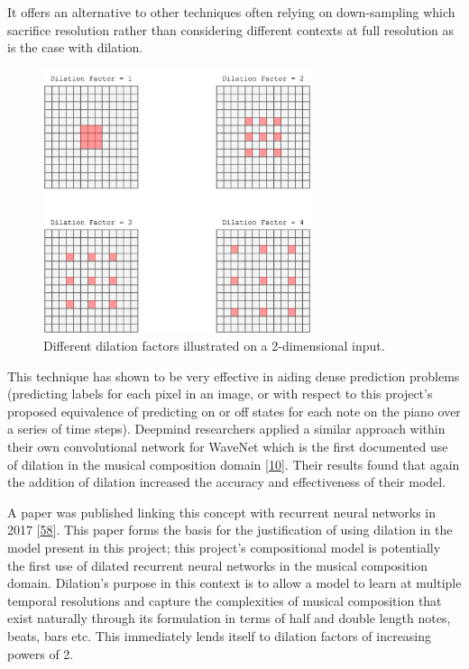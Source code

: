 \documentclass[12pt,]{article}
\begin{document}
It offers an alternative to other techniques often relying on
down-sampling which sacrifice resolution rather than considering
different contexts at full resolution as is the case with dilation.

\begin{figure}
\centering
\includegraphics[width=0.7\textwidth,height=\textheight]{Images/dilation2d.png}
\caption{Different dilation factors illustrated on a 2-dimensional
input.}
\end{figure}

This technique has shown to be very effective in aiding dense prediction
problems (predicting labels for each pixel in an image, or with respect
to this project's proposed equivalence of predicting on or off states
for each note on the piano over a series of time steps). Deepmind
researchers applied a similar approach within their own convolutional
network for WaveNet which is the first documented use of dilation in the
musical composition domain
{[}\protect\hyperlink{ref-oord2016wavenet}{10}{]}. Their results found
that again the addition of dilation increased the accuracy and
effectiveness of their model.

A paper was published linking this concept with recurrent neural
networks in 2017 {[}\protect\hyperlink{ref-chang2017dilated}{58}{]}.
This paper forms the basis for the justification of using dilation in
the model present in this project; this project's compositional model is
potentially the first use of dilated recurrent neural networks in the
musical composition domain. Dilation's purpose in this context is to
allow a model to learn at multiple temporal resolutions and capture the
complexities of musical composition that exist naturally through its
formulation in terms of half and double length notes, beats, bars etc.
This immediately lends itself to dilation factors of increasing powers
of 2.
\end{document}
